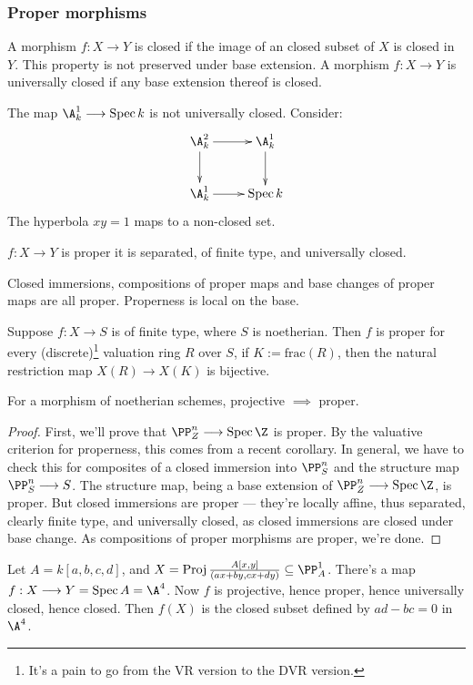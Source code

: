 \documentclass[11pt]{article}
\begin{document}
\begin{Oct20}
\subsubsection*{Proper morphisms}
\begin{defn*}
A morphism $f:X\to Y$ is closed if the image of an closed subset of $X$ is closed in $Y$. This property is not preserved under base extension. A morphism $f:X\to Y$ is universally closed if any base extension thereof is closed.
\end{defn*}
\begin{nonexmp*} The map $\A^1_k\to \spec k$ is not universally closed. Consider:
\[\xymatrix{
\ar[d]\A^2_k\ar[r]&\A^1_k\ar[d]\\
\A^1_k\ar[r]&\spec k
}\]
The hyperbola $xy=1$ maps to a non-closed set.
\end{nonexmp*}
\begin{defn*}
$f:X\to Y$ is proper \Iff it is separated, of finite type, and universally closed.
\end{defn*}
\begin{exmp*}
Closed immersions, compositions of proper maps and base changes of proper maps are all proper. Properness is local on the base.
\end{exmp*}
\begin{thm*}
Suppose $f:X\to S$ is of finite type, where $S$ is noetherian. Then $f$ is proper \Iff for every (discrete)\footnote{It's a pain to go from the VR version to the DVR version.} valuation ring $R$ over $S$, if $K:=\text{frac}(R)$, then the natural restriction map $X(R)\to X(K)$ is bijective.
\end{thm*}
\begin{thm*} For a morphism of noetherian schemes, projective $\implies$ proper.
\end{thm*}
\begin{proof}
First, we'll prove that $\PP^n_Z\to\spec\Z$ is proper. By the valuative criterion for properness, this comes from a recent corollary. In general, we have to check this for composites of a closed immersion into $\PP^n_S$ and the structure map $\PP^n_S\to S$. The structure map, being a base extension of $\PP^n_Z\to\spec\Z$, is proper. But closed immersions are proper --- they're locally affine, thus separated, clearly finite type, and universally closed, as closed immersions are closed under base change. As compositions of proper morphisms are proper, we're done.
\end{proof}
\begin{exmp*}
Let $A=k[a,b,c,d]$, and $X=\proj \frac{A[x,y]}{(ax+by,cx+dy)}\subseteq\PP^1_A$. There's a map $f:X\to Y=\spec A=\A^4$. Now $f$ is projective, hence proper, hence universally closed, hence closed. Then $f(X)$ is the closed subset defined by $ad-bc=0$ in $\A^4$. 


\end{exmp*}
\end{Oct20}
\end{document}
